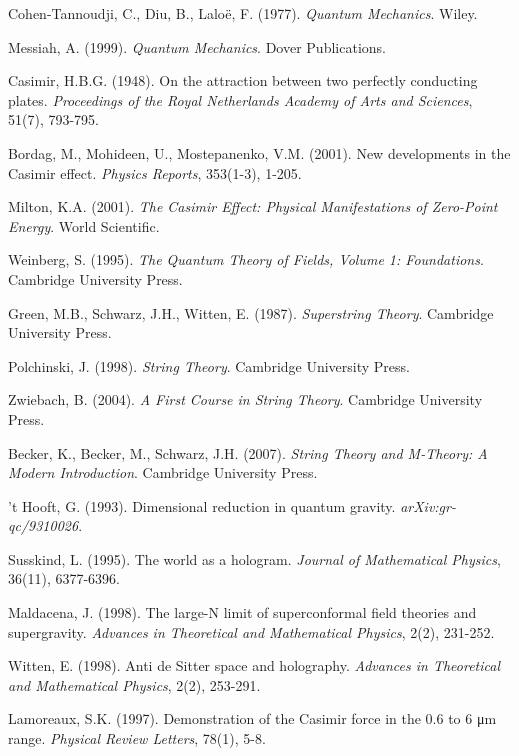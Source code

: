 \documentclass[12pt]{article}
\theoremstyle{plain}
\theoremstyle{definition}
\begin{document}
\begin{thebibliography}{99}
 Cohen-Tannoudji, C., Diu, B., Laloë, F. (1977). \emph{Quantum Mechanics}. Wiley.

 Messiah, A. (1999). \emph{Quantum Mechanics}. Dover Publications.

 Casimir, H.B.G. (1948). On the attraction between two perfectly conducting plates. \emph{Proceedings of the Royal Netherlands Academy of Arts and Sciences}, 51(7), 793-795.

 Bordag, M., Mohideen, U., Mostepanenko, V.M. (2001). New developments in the Casimir effect. \emph{Physics Reports}, 353(1-3), 1-205.

 Milton, K.A. (2001). \emph{The Casimir Effect: Physical Manifestations of Zero-Point Energy}. World Scientific.

 Weinberg, S. (1995). \emph{The Quantum Theory of Fields, Volume 1: Foundations}. Cambridge University Press.

 Green, M.B., Schwarz, J.H., Witten, E. (1987). \emph{Superstring Theory}. Cambridge University Press.

 Polchinski, J. (1998). \emph{String Theory}. Cambridge University Press.

 Zwiebach, B. (2004). \emph{A First Course in String Theory}. Cambridge University Press.

 Becker, K., Becker, M., Schwarz, J.H. (2007). \emph{String Theory and M-Theory: A Modern Introduction}. Cambridge University Press.

 't Hooft, G. (1993). Dimensional reduction in quantum gravity. \emph{arXiv:gr-qc/9310026}.

 Susskind, L. (1995). The world as a hologram. \emph{Journal of Mathematical Physics}, 36(11), 6377-6396.

 Maldacena, J. (1998). The large-N limit of superconformal field theories and supergravity. \emph{Advances in Theoretical and Mathematical Physics}, 2(2), 231-252.

 Witten, E. (1998). Anti de Sitter space and holography. \emph{Advances in Theoretical and Mathematical Physics}, 2(2), 253-291.

 Lamoreaux, S.K. (1997). Demonstration of the Casimir force in the 0.6 to 6 μm range. \emph{Physical Review Letters}, 78(1), 5-8.


\end{thebibliography}
\end{document}
